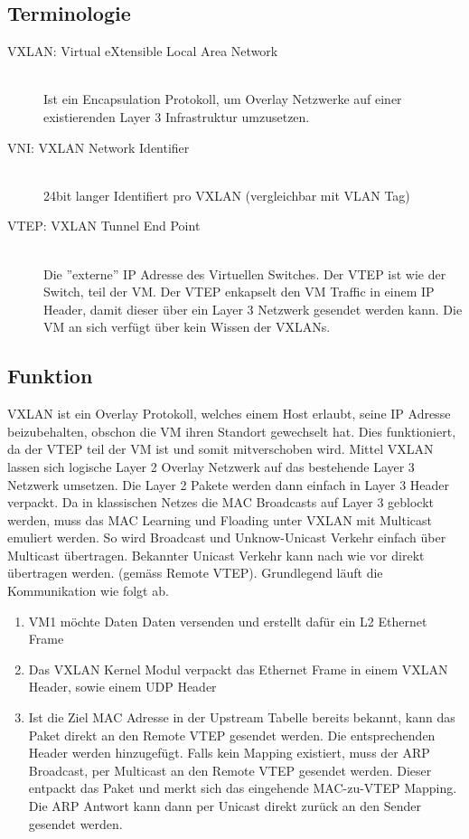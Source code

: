 \subsection{Terminologie}
\begin{description}
	\item[VXLAN: Virtual eXtensible Local Area Network] \hfill \\
	Ist ein Encapsulation Protokoll, um Overlay Netzwerke auf einer existierenden Layer 3 Infrastruktur umzusetzen.
	\item[VNI: VXLAN Network Identifier] \hfill \\
	24bit langer Identifiert pro VXLAN (vergleichbar mit VLAN Tag)
	\item[VTEP: VXLAN Tunnel End Point] \hfill \\
	Die ''externe'' IP Adresse des Virtuellen Switches. Der VTEP ist wie der Switch, teil der VM. Der VTEP enkapselt den VM Traffic in einem IP Header, damit dieser über ein Layer 3 Netzwerk gesendet werden kann. Die VM an sich verfügt über kein Wissen der VXLANs.
\end{description}

\subsection{Funktion}
VXLAN ist ein Overlay Protokoll, welches einem Host erlaubt, seine IP Adresse beizubehalten, obschon die VM ihren Standort gewechselt hat. Dies funktioniert, da der VTEP teil der VM ist und somit mitverschoben wird. Mittel VXLAN lassen sich logische Layer 2 Overlay Netzwerk auf das bestehende Layer 3 Netzwerk umsetzen. Die Layer 2 Pakete werden dann einfach in Layer 3 Header verpackt. Da in klassischen Netzes die MAC Broadcasts auf Layer 3 geblockt werden, muss das MAC Learning und Floading unter VXLAN mit Multicast emuliert werden. So wird Broadcast und Unknow-Unicast Verkehr einfach über Multicast übertragen. Bekannter Unicast Verkehr kann nach wie vor direkt übertragen werden. (gemäss Remote VTEP). Grundlegend läuft die Kommunikation wie folgt ab.

\begin{enumerate}
	\item VM1 möchte Daten Daten versenden und erstellt dafür ein L2 Ethernet Frame
	\item Das VXLAN Kernel Modul verpackt das Ethernet Frame in einem VXLAN Header, sowie einem UDP Header
	\item Ist die Ziel MAC Adresse in der Upstream Tabelle bereits bekannt, kann das Paket direkt an den Remote VTEP gesendet werden. Die entsprechenden Header werden hinzugefügt. Falls kein Mapping existiert, muss der ARP Broadcast, per Multicast an den Remote VTEP gesendet werden. Dieser entpackt das Paket und merkt sich das eingehende MAC-zu-VTEP Mapping. Die ARP Antwort kann dann per Unicast direkt zurück an den Sender gesendet werden.
\end{enumerate}

